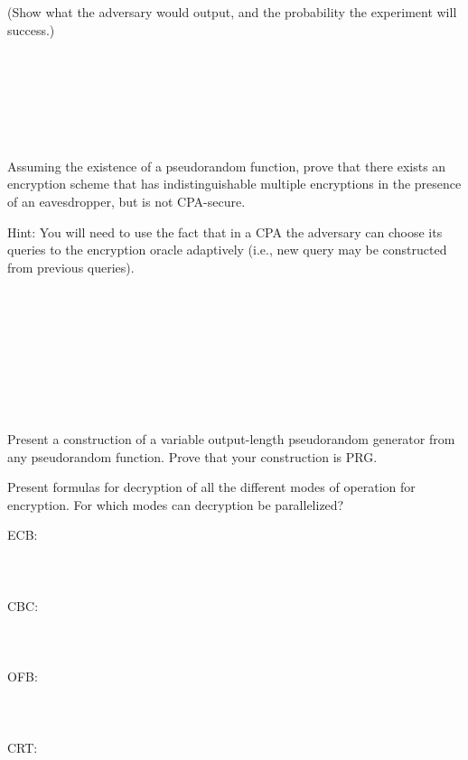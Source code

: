 \documentclass[12pt,letterpaper,boxed]{amspset}
\begin{document}
\begin{solution}
(Show what the adversary would output, and the probability the experiment will success.)
\\
\\
\\
\\
\\
\\
\\
\end{solution}

\begin{problem}[3.2]
Assuming the existence of a pseudorandom function, prove that there exists an encryption scheme that has indistinguishable multiple encryptions in the presence of an eavesdropper, but is not CPA-secure.
\end{problem}

\begin{solution}
{\small Hint: You will need to use the fact that in a CPA the adversary can choose its queries to the encryption oracle adaptively (i.e., new query may be constructed from previous queries).}\\
\\
\\
\\
\\
\\
\\
\\
\\
\end{solution}

\begin{problem}[3.4]
Present a construction of a variable output-length pseudorandom generator from any pseudorandom function. Prove that your construction is PRG.
\end{problem}

\begin{solution}
\vspace{5cm}
\end{solution}

\begin{problem}[3.5]
Present formulas for decryption of all the different modes of operation for encryption. For which modes can decryption be parallelized?
\end{problem}

\begin{solution}
ECB:\\
\\
\\
\\
CBC:\\
\\
\\
\\
OFB:\\
\\
\\
\\
CRT:\\
\\
\\
\\
\end{solution}
\end{document}
